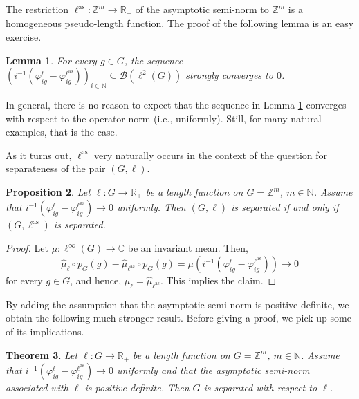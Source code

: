 \documentclass[a4paper,11pt,reqno]{amsart}
\numberwithin{equation}{section}
\numberwithin{equation}{section}
\newtheorem{theorem}{Theorem}[section]
\newtheorem{lemma}[theorem]{Lemma}
\newtheorem{proposition}[theorem]{Proposition}
\theoremstyle{definition}
\theoremstyle{remark}
\theoremstyle{remark}
\begin{document}
The restriction $\ell^{\text{as}}:\mathbb{Z}^{m}\rightarrow\mathbb{R}_{+}$
of the asymptotic semi-norm to $\mathbb{Z}^{m}$ is a homogeneous
pseudo-length function. The proof of the following lemma is an easy
exercise.

\begin{lemma} \label{StrongConvergence} For every $g\in G$, the
sequence $(i^{-1}(\varphi_{ig}^{\ell}-\varphi_{ig}^{\ell^{\text{as}}}))_{i\in\mathbb{N}}\subseteq\mathcal{B}(\ell^{2}(G))$
strongly converges to $0$. \end{lemma}

In general, there is no reason to expect that the sequence in Lemma
\ref{StrongConvergence} converges with respect to the operator norm (i.e., uniformly). Still,
for many natural examples, that is the case.

As it turns out, $\ell^{\text{as}}$
very naturally occurs in the context of the question for separateness
of the pair $(G,\ell)$.

\begin{proposition} \label{OperatorConvergence} Let $\ell:G\rightarrow\mathbb{R}_{+}$
be a length function on $G=\mathbb{Z}^{m}$, $m\in\mathbb{N}$. Assume
that $i^{-1}(\varphi_{ig}^{\ell}-\varphi_{ig}^{\ell^{\text{as}}})\rightarrow0$
uniformly. Then $(G,\ell)$ is separated if and only if
$(G,\ell^{\text{as}})$ is separated. \end{proposition}

\begin{proof} Let $\mu:\ell^{\infty}(G)\rightarrow\mathbb{C}$ be
an invariant mean. Then,
\[
\widehat{\mu}_{\ell}\circ p_{G}(g)-\widehat{\mu}_{\ell^{\text{as}}}\circ p_{G}(g)=\mu(i^{-1}(\varphi_{ig}^{\ell}-\varphi_{ig}^{\ell^{\text{as}}}))\rightarrow0
\]
for every $g\in G$, and hence, $\widehat{\mu}_{\ell}=\widehat{\mu}_{\ell^{\text{as}}}$.
This implies the claim. \end{proof}

By adding the assumption that the asymptotic semi-norm is positive
definite, we obtain the following much stronger result. Before giving a proof, we pick up some of its implications.

\begin{theorem} \label{StrongerResult} Let $\ell:G\rightarrow\mathbb{R}_{+}$
be a length function on $G=\mathbb{Z}^{m}$, $m\in\mathbb{N}$. Assume
that $i^{-1}(\varphi_{ig}^{\ell}-\varphi_{ig}^{\ell^{\text{as}}})\rightarrow0$
uniformly and that the asymptotic semi-norm associated with
$\ell$ is positive definite. Then $G$ is separated with respect
to $\ell$. \end{theorem}
\end{document}
